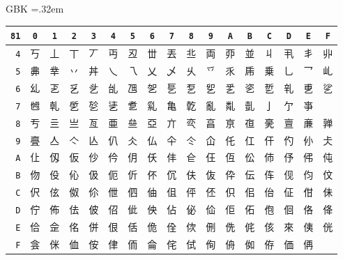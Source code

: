 \documentclass{beamer}
\begin{document}
\begin{frame}[fragile]{GBK}%
\begingroup\def\.#1{\texttt{\color{gray}\tiny#1}}%
\tabcolsep=.32em
\begin{tabular}{r|cccccccccccccccc}
\texttt{\color{gray}\footnotesize 81} &
  \.0 & \.1 & \.2 & \.3 & \.4 & \.5 & \.6 & \.7 &
  \.8 & \.9 & \.A & \.B & \.C & \.D & \.E & \.F \\
\hline
\.4 & 丂 & 丄 & 丅 & 丆 & 丏 & 丒 & 丗 & 丟 & 丠 & 両 & 丣 & 並 & 丩 & 丮 & 丯 & 丱 \\
\.5 & 丳 & 丵 & 丷 & 丼 & 乀 & 乁 & 乂 & 乄 & 乆 & 乊 & 乑 & 乕 & 乗 & 乚 & 乛 & 乢 \\
\.6 & 乣 & 乤 & 乥 & 乧 & 乨 & 乪 & 乫 & 乬 & 乭 & 乮 & 乯 & 乲 & 乴 & 乵 & 乶 & 乷 \\
\.7 & 乸 & 乹 & 乺 & 乻 & 乼 & 乽 & 乿 & 亀 & 亁 & 亂 & 亃 & 亄 & 亅 & 亇 & 亊 &    \\
\.8 & 亐 & 亖 & 亗 & 亙 & 亜 & 亝 & 亞 & 亣 & 亪 & 亯 & 亰 & 亱 & 亴 & 亶 & 亷 & 亸 \\
\.9 & 亹 & 亼 & 亽 & 亾 & 仈 & 仌 & 仏 & 仐 & 仒 & 仚 & 仛 & 仜 & 仠 & 仢 & 仦 & 仧 \\
\.A & 仩 & 仭 & 仮 & 仯 & 仱 & 仴 & 仸 & 仹 & 仺 & 仼 & 仾 & 伀 & 伂 & 伃 & 伄 & 伅 \\
\.B & 伆 & 伇 & 伈 & 伋 & 伌 & 伒 & 伓 & 伔 & 伕 & 伖 & 伜 & 伝 & 伡 & 伣 & 伨 & 伩 \\
\.C & 伬 & 伭 & 伮 & 伱 & 伳 & 伵 & 伷 & 伹 & 伻 & 伾 & 伿 & 佀 & 佁 & 佂 & 佄 & 佅 \\
\.D & 佇 & 佈 & 佉 & 佊 & 佋 & 佌 & 佒 & 佔 & 佖 & 佡 & 佢 & 佦 & 佨 & 佪 & 佫 & 佭 \\
\.E & 佮 & 佱 & 佲 & 併 & 佷 & 佸 & 佹 & 佺 & 佽 & 侀 & 侁 & 侂 & 侅 & 來 & 侇 & 侊 \\
\.F & 侌 & 侎 & 侐 & 侒 & 侓 & 侕 & 侖 & 侘 & 侙 & 侚 & 侜 & 侞 & 侟 & 価 & 侢 &    
\end{tabular}
\endgroup
\end{frame}
\end{document}
